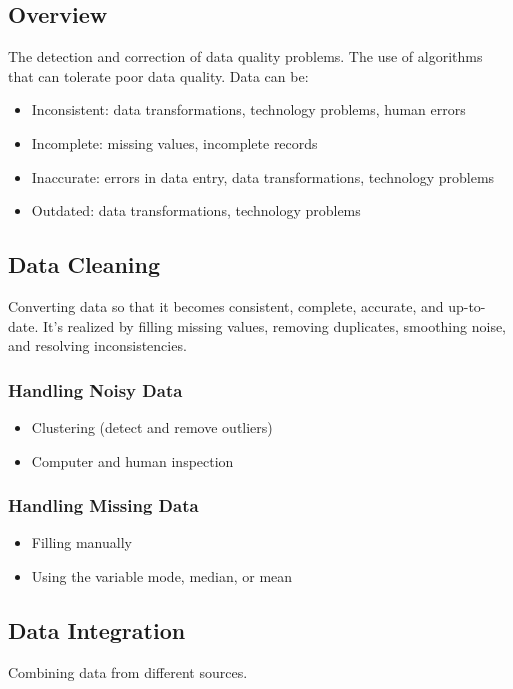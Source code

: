 \subsection*{Overview}
The detection and correction of data quality problems. The use of algorithms that can tolerate poor data quality. Data can be:
\begin{itemize}[noitemsep]
    \item Inconsistent: data transformations, technology problems, human errors
    \item Incomplete: missing values, incomplete records
    \item Inaccurate: errors in data entry, data transformations, technology problems
    \item Outdated: data transformations, technology problems
\end{itemize}

\subsection*{Data Cleaning}
Converting data so that it becomes consistent, complete, accurate, and up-to-date. It's realized by filling missing values, removing duplicates, smoothing noise, and resolving inconsistencies.

\subsubsection*{Handling Noisy Data}
\begin{itemize}[noitemsep]
    \item Clustering (detect and remove outliers)
    \item Computer and human inspection
\end{itemize}

\subsubsection*{Handling Missing Data}
\begin{itemize}[noitemsep]
    \item Filling manually
    \item Using the variable mode, median, or mean
\end{itemize}

\subsection*{Data Integration}
Combining data from different sources.

